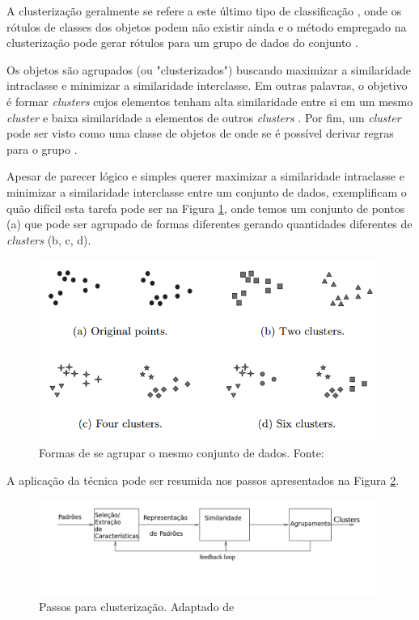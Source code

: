A clusterização geralmente se refere a este último tipo de classificação \cite{tan2013data}, onde os rótulos de classes dos objetos podem não existir ainda e 
o método empregado na clusterização pode gerar rótulos para um grupo de dados do conjunto \cite{han2011data}.

Os objetos são agrupados (ou "clusterizados") buscando maximizar a similaridade intraclasse e minimizar a similaridade interclasse.
Em outras palavras, o objetivo é formar \textit{clusters} cujos elementos tenham alta similaridade entre si em um mesmo \textit{cluster} 
e baixa similaridade a elementos de outros \textit{clusters} \cite{han2011data}. Por fim, um \textit{cluster} pode ser visto como uma
classe de objetos de onde se é possível derivar regras para o grupo \cite{han2011data}.

Apesar de parecer lógico e simples querer maximizar a similaridade intraclasse e minimizar a similaridade interclasse entre um conjunto de dados, 
 exemplificam o quão difícil esta tarefa pode ser na Figura \ref{fig:clusters_difficulty}, onde temos um conjunto
de pontos (a) que pode ser agrupado de formas diferentes gerando quantidades diferentes de \textit{clusters} (b, c, d).

\begin{figure}[h!]
\centering
\includegraphics[scale=0.4]{figuras/clusters_difficulty.png}
\caption{Formas de se agrupar o mesmo conjunto de dados. Fonte: \cite{tan2013data}}
\label{fig:clusters_difficulty}
\end{figure}

A aplicação da técnica pode ser resumida nos passos apresentados na Figura \ref{fig:tasks_clustering}.

\begin{figure}[h!]
\centering
\includegraphics[scale=0.6]{figuras/tasks_clustering.png}
\caption{Passos para clusterização. Adaptado de }
\label{fig:tasks_clustering}
\end{figure}

